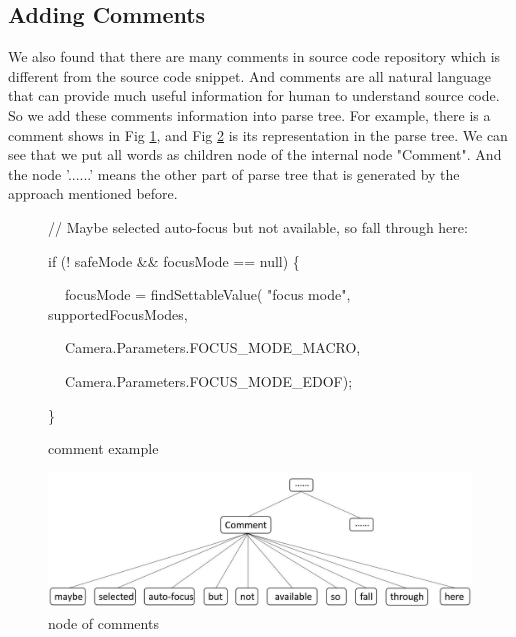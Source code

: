 \subsection{Adding Comments}


We also found that there are many comments in source code repository which is different from the source code snippet. And comments are all natural language that can provide much useful information for human to understand source code. So we add these comments information into parse tree. For example, there is a comment shows in Fig \ref{figure:commentExample}, and Fig \ref{figure:nodeOfComment} is its representation in the parse tree. We can see that we put all words as children node of the internal node "Comment". And the node '......' means the other part of parse tree that is generated by the approach mentioned before.

\begin{figure}[!htp]
\footnotesize{
\textcolor[rgb]{0,0,1}{// Maybe selected auto-focus but not available, so fall through here:}

    \textcolor[rgb]{0.7,0.1,0.1}{if} (!
    \textcolor[rgb]{0,0,1}{safeMode} \&\&
    \textcolor[rgb]{0,0,1}{focusMode}
     == \textcolor[rgb]{0.7,0.1,0.1}{null}) \{

     $~~~~$
        \textcolor[rgb]{0,0,1}{focusMode}
         = findSettableValue(
         \textcolor[rgb]{0,0,1}{"focus mode"},
        \textcolor[rgb]{0,0,1}{supportedFocusModes},

      $~~~~$
        Camera.Parameters.\textcolor[rgb]{0,0,1}{FOCUS\_MODE\_MACRO},

      $~~~~$
        Camera.Parameters.\textcolor[rgb]{0,0,1}{FOCUS\_MODE\_EDOF});

    \}
 }

 \caption{\label{figure:commentExample} comment example}
\end{figure}

\begin{figure}[!htp]
 \centering
 \includegraphics[width=\linewidth]{img/comment.pdf}
 \caption{\label{figure:nodeOfComment} node of comments}
\end{figure}

